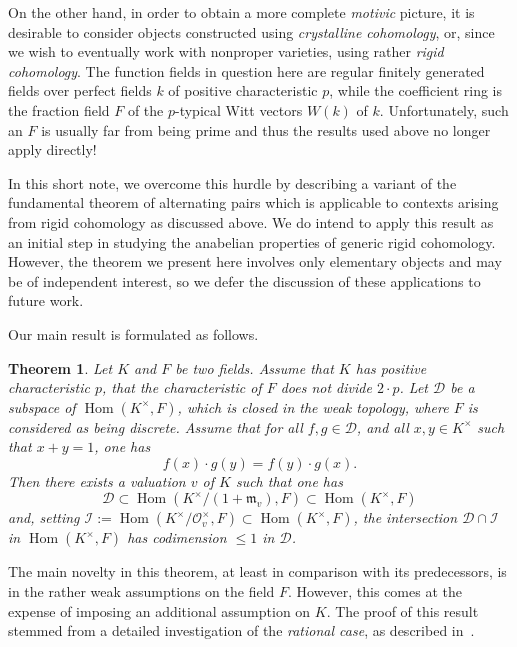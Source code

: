 \documentclass[12pt]{amsart}
\newcommand{\Hom}{\operatorname{Hom}}
\newcommand{\Dcal}{\mathcal{D}}
\newcommand{\Ical}{\mathcal{I}}
\newcommand{\mfrak}{\mathfrak{m}}
\newcommand{\Ocal}{\mathcal{O}}
\newtheorem{maintheorem}{Theorem}
\begin{document}
On the other hand, in order to obtain a more complete \emph{motivic} picture, it is desirable to consider objects constructed using \emph{crystalline cohomology}, or, since we wish to eventually work with nonproper varieties, using rather \emph{rigid cohomology}.
The function fields in question here are regular finitely generated fields over perfect fields $k$ of positive characteristic $p$, while the coefficient ring is the fraction field $F$ of the $p$-typical Witt vectors $W(k)$ of $k$.
Unfortunately, such an $F$ is usually far from being prime and thus the results used above no longer apply directly!

In this short note, we overcome this hurdle by describing a variant of the fundamental theorem of alternating pairs which is applicable to contexts arising from rigid cohomology as discussed above.
We do intend to apply this result as an initial step in studying the anabelian properties of generic rigid cohomology.
However, the theorem we present here involves only elementary objects and may be of independent interest, so we defer the discussion of these applications to future work.

Our main result is formulated as follows.

\begin{maintheorem}\label{maintheorem}
  Let $K$ and $F$ be two fields.
  Assume that $K$ has positive characteristic $p$, that the characteristic of $F$ does not divide $2 \cdot p$.
  Let $\Dcal$ be a subspace of $\Hom(K^{\times},F)$, which is closed in the weak topology, where $F$ is considered as being discrete.
  Assume that for all $f,g \in \Dcal$, and all $x,y \in K^{\times}$ such that $x + y = 1$, one has
  \[ f(x) \cdot g(y) = f(y) \cdot g(x). \]
  Then there exists a valuation $v$ of $K$ such that one has
  \[ \Dcal \subset \Hom(K^{\times}/(1+\mfrak_{v}),F) \subset \Hom(K^{\times},F) \]
  and, setting $\Ical := \Hom(K^{\times}/\Ocal_{v}^{\times},F) \subset \Hom(K^{\times},F)$, the intersection $\Dcal \cap \Ical$ in $\Hom(K^{\times},F)$ has codimension $\le 1$ in $\Dcal$.
\end{maintheorem}

The main novelty in this theorem, at least in comparison with its predecessors, is in the rather weak assumptions on the field $F$.
However, this comes at the expense of imposing an additional assumption on $K$.
The proof of this result stemmed from a detailed investigation of the \emph{rational case}, as described in~\cite[\S A]{https://doi.org/10.48550/arxiv.1705.01084}.
\end{document}
